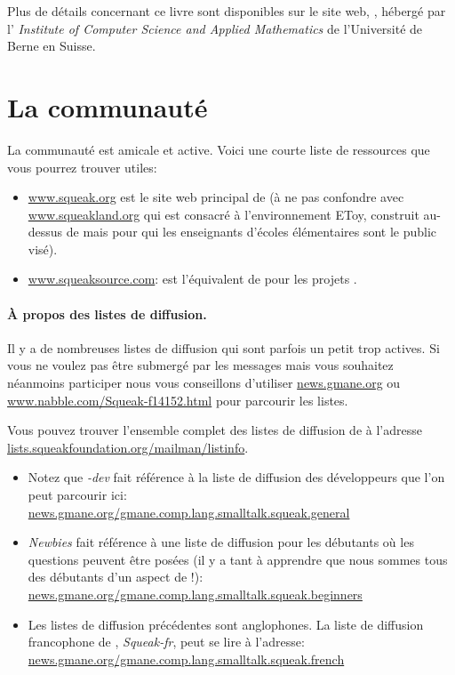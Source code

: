 \documentclass[a4paper,10pt,twoside]{book}
\begin{document}
Plus de d\'etails concernant ce livre sont disponibles sur le site
web, \spe, h\'eberg\'e par l' \emph{Institute of Computer Science and
  Applied Mathematics} de l'Universit\'e de Berne en Suisse.

\section*{La communaut\'e \sq}

La communaut\'e \sq est amicale et active.
Voici une courte liste de ressources que vous pourrez trouver utiles:

\begin{itemize}
\item \url{www.squeak.org} est le site web principal de \sq (\`a ne
  pas confondre avec  \url{www.squeakland.org} qui est consacr\'e \`a
  l'environnement EToy, construit au-dessus de \sq mais pour qui
  les enseignants d'\'ecoles \'el\'ementaires sont le public vis\'e).

\item \url{www.squeaksource.com}: \squeaksource est l'\'equivalent de \sourceforge pour les projets \sq.
\end{itemize}

\paragraph{\`A propos des listes de diffusion.} Il y a de nombreuses listes de diffusion qui sont parfois un petit trop actives. Si vous ne voulez pas \^etre submerg\'e par les messages mais vous souhaitez n\'eanmoins participer nous vous conseillons d'utiliser \url{news.gmane.org} ou \url{www.nabble.com/Squeak-f14152.html} pour parcourir les listes.

Vous pouvez trouver l'ensemble complet des listes de diffusion de \sq \`a l'adresse \url{lists.squeakfoundation.org/mailman/listinfo}.

\begin{itemize}
\item Notez que \emph{\sq-dev} fait r\'ef\'erence \`a la liste de diffusion des d\'eveloppeurs  que l'on peut parcourir ici:\\
\url{news.gmane.org/gmane.comp.lang.smalltalk.squeak.general}
\item \emph{Newbies} fait r\'ef\'erence \`a une liste de diffusion
  pour les d\'ebutants o\`u les questions peuvent \^etre pos\'ees (il
  y a tant \`a apprendre que nous sommes tous des d\'ebutants d'un
  aspect de \sq!):\\
\url{news.gmane.org/gmane.comp.lang.smalltalk.squeak.beginners}
\item Les listes de diffusion pr\'ec\'edentes sont anglophones. La
  liste de diffusion francophone de \sq, \emph{Squeak-fr}, peut se
  lire \`a l'adresse:\\
\url{news.gmane.org/gmane.comp.lang.smalltalk.squeak.french}
\end{itemize}
\end{document}
